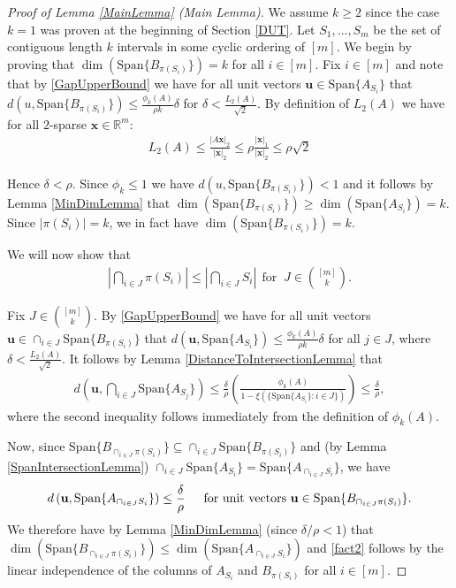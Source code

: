 \documentclass[journal, twocolumn]{IEEEtran}
\begin{document}
\begin{proof}[Proof of Lemma \ref{MainLemma} (Main Lemma)]
We assume $k \geq 2$ since the case $k = 1$ was proven at the beginning of Section \ref{DUT}. Let $S_1, \ldots, S_m$ be the set of contiguous length $k$ intervals in some cyclic ordering of $[m]$. We begin by proving that $\dim(\text{Span}\{B_{\pi(S_i)}\}) = k$ for all $i \in [m]$. 
Fix $i \in [m]$ and note that by \eqref{GapUpperBound} we have for all unit vectors $\mathbf{u} \in \text{Span}\{A_{S_i}\}$ that $d(u, \text{Span}\{B_{\pi(S_i)}\}) \leq \frac{\phi_k(A)}{\rho k} \delta$ for $\delta < \frac{L_2(A)}{ \sqrt{2}}$. By definition of $L_2(A)$ we have for all $2$-sparse $\mathbf{x} \in \mathbb{R}^m$:
\begin{align}
L_2(A) \leq \frac{|A\mathbf{x}|_2}{|\mathbf{x}|_2} \leq \rho \frac{|\mathbf{x}|_1}{|\mathbf{x}|_2} \leq \rho \sqrt{2}
\end{align}

Hence $\delta < \rho$. Since $\phi_k \leq 1$ we have $d(u, \text{Span}\{B_{\pi(S_i)}\}) < 1$ and it follows by Lemma \ref{MinDimLemma} that $\dim(\text{Span}\{B_{\pi(S_i)}\}) \geq \dim(\text{Span}\{A_{S_i}\}) = k$. Since $|\pi(S_i)| = k$, we in fact have $\dim(\text{Span}\{B_{\pi(S_i)}\}) = k$. %

We will now show that
\begin{align}\label{fact2}
|\bigcap_{i \in J} \pi(S_i)| \leq |\bigcap_{i \in J} S_i | \ \ \text{for } \ J \in {[m] \choose k}.
\end{align}

Fix $J \in {[m] \choose k}$. By \eqref{GapUpperBound} we have for all unit vectors $\mathbf{u} \in \cap_{i \in J} \text{Span}\{B_{\pi(S_i)}\}$ that $d(\mathbf{u}, \text{Span}\{A_{S_i}\}) \leq \frac{\phi_k(A)}{\rho k} \delta$ for all $j \in J$, where $\delta < \frac{L_2(A)}{\sqrt{2}}$. It follows by Lemma \ref{DistanceToIntersectionLemma} that
\begin{align*}
d\left( \mathbf{u}, \bigcap_{i \in J} \text{Span}\{A_{S_j}\} \right) 
\leq \frac{\delta}{\rho} \left( \frac{ \phi_k(A) }{1 - \xi( \{ \text{Span}\{A_{S_i}\}: i \in J\} ) } \right) \leq \frac{\delta}{\rho},
\end{align*}
%
where the second inequality follows immediately from the definition of $\phi_k(A)$. 

Now, since \mbox{$\text{Span}\{B_{\cap_{i \in J}\pi(S_i)}\} \subseteq \cap_{i \in J} \text{Span}\{B_{\pi(S_i)}\}$} and (by Lemma \ref{SpanIntersectionLemma}) $\cap_{i \in J}  \text{Span}\{A_{S_i}\} = \text{Span}\{A_{\cap_{i \in J}  S_i}\}$, we have
\begin{align}\label{fact1}
d\left( \mathbf{u}, \text{Span}\{A_{\cap_{i \in J} S_i}\} \right) \leq \frac{\delta}{\rho} \indent \text{for unit vectors } \mathbf{u} \in \text{Span}\{B_{\cap_{i \in J}\pi(S_i)}\}.
\end{align}
We therefore have by Lemma \ref{MinDimLemma} (since $\delta/\rho < 1$) that $\dim(\text{Span}\{B_{\cap_{i \in J}\pi(S_i)}\}) \leq \dim(\text{Span}\{A_{\cap_{i \in J} S_i}\})$ and \eqref{fact2} follows by the linear independence of the columns of $A_{S_i}$ and $B_{\pi(S_i)}$ for all $i \in [m]$.


\end{proof}
\end{document}
